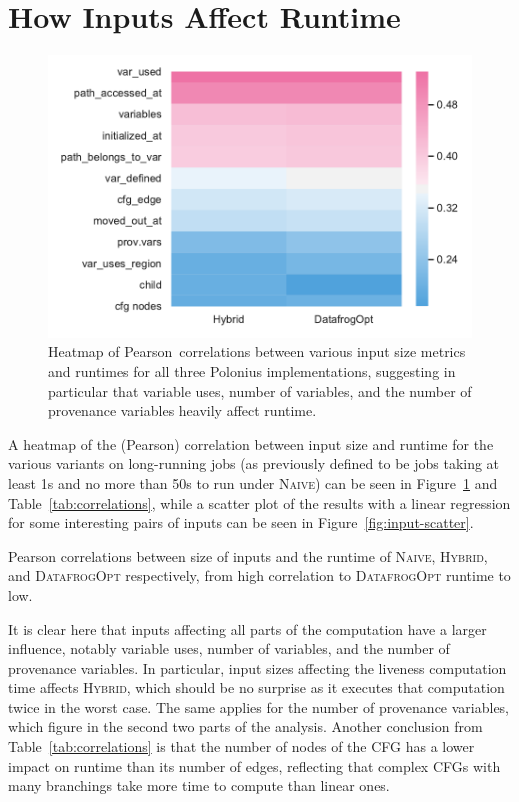 \documentclass[11pt,a4paper,twoside,openany]{report}
\begin{document}
\section{How Inputs Affect Runtime}\label{sec:inputs:correlation}
\begin{figure}
  \includegraphics[width=0.9\linewidth]{Graphs/corr_heatmap.pdf}
  \caption[Heatmap of Input Sizes Affecting Runtime]{Heatmap of
    Pearson~correlations between various input size metrics and runtimes for
    all three Polonius implementations, suggesting in particular that variable
    uses, number of variables, and the number of provenance variables heavily
    affect runtime.}\label{fig:corr-heatmap}
\end{figure}
A heatmap of the (Pearson) correlation between input size and runtime for the
various variants on long-running jobs (as previously defined to be jobs taking
at least 1s and no more than 50s to run under \textsc{Naive}) can be seen in
Figure~\ref{fig:corr-heatmap} and Table~\ref{tab:correlations}, while a scatter
plot of the results with a linear regression for some interesting pairs of
inputs can be seen in Figure~\ref{fig:input-scatter}.

\begin{table}[ht]
  
  \caption[Pearson Correlations Between Sizes of Inputs and Runtime]{Pearson
    correlations between size of inputs and the runtime of \textsc{Naive},
    \textsc{Hybrid}, and \textsc{DatafrogOpt} respectively, from high
    correlation to \textsc{DatafrogOpt} runtime to low.}\label{tab:correlations}
\end{table}%

It is clear here that inputs affecting all parts of the computation have a
larger influence, notably variable uses, number of variables, and the number of
provenance variables. In particular, input sizes affecting the liveness
computation time affects \textsc{Hybrid}, which should be no surprise as it
executes that computation twice in the worst case. The same applies for the
number of provenance variables, which figure in the second two parts of the
analysis. Another conclusion from Table~\ref{tab:correlations} is that the
number of nodes of the CFG has a lower impact on runtime than its number of
edges, reflecting that complex CFGs with many branchings take more time to
compute than linear ones.
\end{document}
